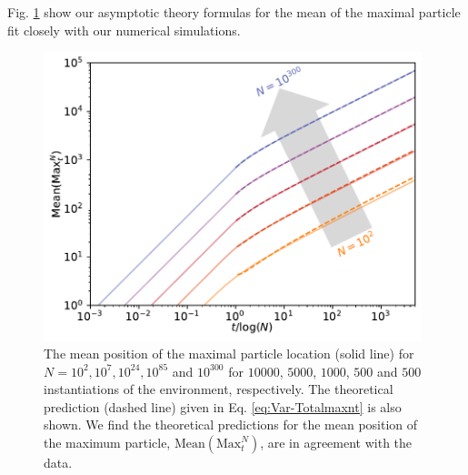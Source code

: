 \documentclass[letter,reqno, 11pt, oneside]{amsart}
\def\maxnt{\mathrm{Max}^{N}_t}
\newcommand{\mean}[1]{\mathrm{Mean}\left(#1\right)}
\begin{document}
Fig. \ref{fig:MaxMean} show our asymptotic theory formulas for the mean of the maximal particle fit closely with our numerical simulations.


\begin{figure}[ht]
 \includegraphics[width=11cm]{MaxMean}
 \caption{The mean position of the maximal particle location (solid line) for $N=10^2, 10^{7}, 10^{24}, 10^{85}$ and $10^{300}$ for $10000$, $5000$, $1000$, $500$ and $500$ instantiations of the environment, respectively. The theoretical prediction (dashed line) given in Eq. \eqref{eq:Var-Totalmaxnt} is also shown. We find the theoretical predictions for the mean position of the maximum particle, $\mean \maxnt$, are in agreement with the data.}
 \label{fig:MaxMean}
\end{figure}




\end{document}
